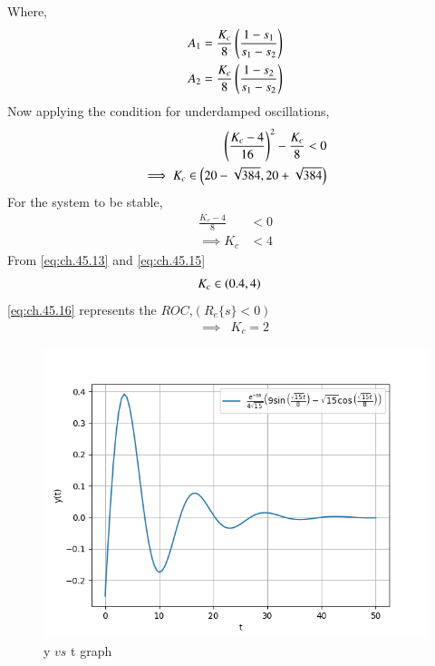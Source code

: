 \documentclass[journal,12pt,twocolumn]{IEEEtran}
\theoremstyle{remark}
\begin{document}
Where,
\begin{align}
    A_1 &= \frac{K_c}{8} \left(\frac{1-s_1}{s_1-s_2}\right)    \\
    A_2 &= \frac{K_c}{8} \left(\frac{1-s_2}{s_1-s_2}\right)    
\end{align}
Now applying the condition for underdamped oscillations,
\begin{align}
    \left(\frac{K_c-4}{16}\right)^2 - \frac{K_c}{8} < 0    \\
    \implies K_c \in \left(20-\sqrt{384} , 20+\sqrt{384}\right)   \label{eq:ch.45.13}
\end{align}
For the system to be stable,
\begin{align}
    \frac{K_c-4}{8}&<0   \\
    \implies K_c&<4 	\label{eq:ch.45.15}
\end{align}
From \eqref{eq:ch.45.13} and \eqref{eq:ch.45.15}
\begin{align}
    &K_c \in \left(0.4,4\right)    \label{eq:ch.45.16}
\end{align}
\eqref{eq:ch.45.16} represents the $ROC$,$(R_e\{s\}<0)$
\begin{align}
    \implies &K_c=2
\end{align}
\begin{figure}[htbp]
    \centering
    \includegraphics[width=\columnwidth]{2023/CH/45/figs/b.png}
    \caption{y $vs$ t graph}
    \label{fig:ch.45.2}
\end{figure}     
\end{document}
